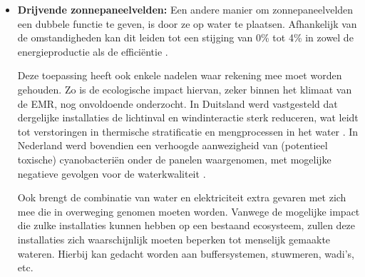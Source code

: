 \begin{itemize}
    \item \textbf{Drijvende zonnepaneelvelden:} Een andere manier om zonnepaneelvelden een dubbele functie te geven, is door ze op water te plaatsen. Afhankelijk van de omstandigheden kan dit leiden tot een stijging van 0\% tot 4\% in zowel de energieproductie als de efficiëntie \autocite{C.J.2024}.
    
    Deze toepassing heeft ook enkele nadelen waar rekening mee moet worden gehouden. Zo is de ecologische impact hiervan, zeker binnen het klimaat van de EMR, nog onvoldoende onderzocht. In Duitsland werd vastgesteld dat dergelijke installaties de lichtinval en windinteractie sterk reduceren, wat leidt tot verstoringen in thermische stratificatie en mengprocessen in het water \autocite{Ilgen2023}. In Nederland werd bovendien een verhoogde aanwezigheid van (potentieel toxische) cyanobacteriën onder de panelen waargenomen, met mogelijke negatieve gevolgen voor de waterkwaliteit \autocite{Sandrini2025}.\medskip
    
    Ook brengt de combinatie van water en elektriciteit extra gevaren met zich mee die in overweging genomen moeten worden. Vanwege de mogelijke impact die zulke installaties kunnen hebben op een bestaand ecosysteem, zullen deze installaties zich waarschijnlijk moeten beperken tot menselijk gemaakte wateren. Hierbij kan gedacht worden aan buffersystemen, stuwmeren, wadi's, etc.
    
\end{itemize}







